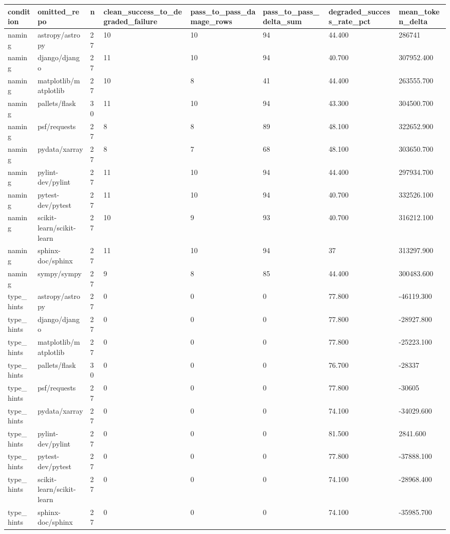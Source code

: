 \begin{tabular}{llllllll}
\toprule
condition & omitted\_repo & n & clean\_success\_to\_degraded\_failure & pass\_to\_pass\_damage\_rows & pass\_to\_pass\_delta\_sum & degraded\_success\_rate\_pct & mean\_token\_delta \\
\midrule
naming & astropy/astropy & 27 & 10 & 10 & 94 & 44.400 & 286741 \\
naming & django/django & 27 & 11 & 10 & 94 & 40.700 & 307952.400 \\
naming & matplotlib/matplotlib & 27 & 10 & 8 & 41 & 44.400 & 263555.700 \\
naming & pallets/flask & 30 & 11 & 10 & 94 & 43.300 & 304500.700 \\
naming & psf/requests & 27 & 8 & 8 & 89 & 48.100 & 322652.900 \\
naming & pydata/xarray & 27 & 8 & 7 & 68 & 48.100 & 303650.700 \\
naming & pylint-dev/pylint & 27 & 11 & 10 & 94 & 44.400 & 297934.700 \\
naming & pytest-dev/pytest & 27 & 11 & 10 & 94 & 40.700 & 332526.100 \\
naming & scikit-learn/scikit-learn & 27 & 10 & 9 & 93 & 40.700 & 316212.100 \\
naming & sphinx-doc/sphinx & 27 & 11 & 10 & 94 & 37 & 313297.900 \\
naming & sympy/sympy & 27 & 9 & 8 & 85 & 44.400 & 300483.600 \\
type\_hints & astropy/astropy & 27 & 0 & 0 & 0 & 77.800 & -46119.300 \\
type\_hints & django/django & 27 & 0 & 0 & 0 & 77.800 & -28927.800 \\
type\_hints & matplotlib/matplotlib & 27 & 0 & 0 & 0 & 77.800 & -25223.100 \\
type\_hints & pallets/flask & 30 & 0 & 0 & 0 & 76.700 & -28337 \\
type\_hints & psf/requests & 27 & 0 & 0 & 0 & 77.800 & -30605 \\
type\_hints & pydata/xarray & 27 & 0 & 0 & 0 & 74.100 & -34029.600 \\
type\_hints & pylint-dev/pylint & 27 & 0 & 0 & 0 & 81.500 & 2841.600 \\
type\_hints & pytest-dev/pytest & 27 & 0 & 0 & 0 & 77.800 & -37888.100 \\
type\_hints & scikit-learn/scikit-learn & 27 & 0 & 0 & 0 & 74.100 & -28968.400 \\
type\_hints & sphinx-doc/sphinx & 27 & 0 & 0 & 0 & 74.100 & -35985.700 \\

\end{tabular}
